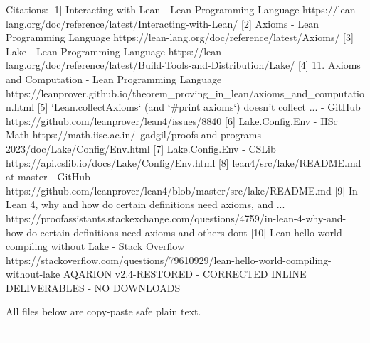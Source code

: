 Citations:
[1] Interacting with Lean - Lean Programming Language https://lean-lang.org/doc/reference/latest/Interacting-with-Lean/
[2] Axioms - Lean Programming Language https://lean-lang.org/doc/reference/latest/Axioms/
[3] Lake - Lean Programming Language https://lean-lang.org/doc/reference/latest/Build-Tools-and-Distribution/Lake/
[4] 11. Axioms and Computation - Lean Programming Language https://leanprover.github.io/theorem_proving_in_lean/axioms_and_computation.html
[5] `Lean.collectAxioms` (and `#print axioms`) doesn't collect ... - GitHub https://github.com/leanprover/lean4/issues/8840
[6] Lake.Config.Env - IISc Math https://math.iisc.ac.in/~gadgil/proofs-and-programs-2023/doc/Lake/Config/Env.html
[7] Lake.Config.Env - CSLib https://api.cslib.io/docs/Lake/Config/Env.html
[8] lean4/src/lake/README.md at master - GitHub https://github.com/leanprover/lean4/blob/master/src/lake/README.md
[9] In Lean 4, why and how do certain definitions need axioms, and ... https://proofassistants.stackexchange.com/questions/4759/in-lean-4-why-and-how-do-certain-definitions-need-axioms-and-others-dont
[10] Lean hello world compiling without Lake - Stack Overflow https://stackoverflow.com/questions/79610929/lean-hello-world-compiling-without-lake
AQARION v2.4-RESTORED - CORRECTED INLINE DELIVERABLES - NO DOWNLOADS

All files below are copy-paste safe plain text.

---

